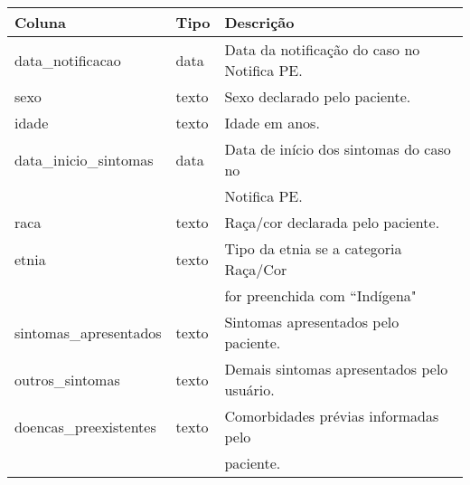 \begin{table}[H]
  \centering
  \begin{longtable}{lll}
  \hline
  \multicolumn{1}{|l|}{\textbf{Coluna}} & \multicolumn{1}{l|}{\textbf{Tipo}} & \multicolumn{1}{l|}{\textbf{Descrição}}                                                                                    \\ \hline
  data\_notificacao                     & data                          & Data da notificação do caso no Notifica PE.                                                                                \\
  sexo                                  & texto                               & Sexo declarado pelo paciente.                                                                                              \\
  idade                                 & texto                               & Idade em anos.                                                                                                             \\
  data\_inicio\_sintomas                & data                          & Data de início dos sintomas do caso no \\ & & Notifica PE.                                                                        \\
  raca                                  & texto                               & Raça/cor declarada pelo paciente.                                                                                          \\
  etnia                                 & texto                               & Tipo da etnia se a categoria Raça/Cor \\ & & for preenchida com “Indígena"                                                        \\
  sintomas\_apresentados                & texto                               & Sintomas apresentados pelo paciente.                                                                                       \\
  outros\_sintomas                      & texto                               & Demais sintomas apresentados pelo usuário.                                                                                 \\
  doencas\_preexistentes                & texto                               & Comorbidades prévias informadas pelo \\ & & paciente.                                                                             \\

\end{longtable}
\end{table}
